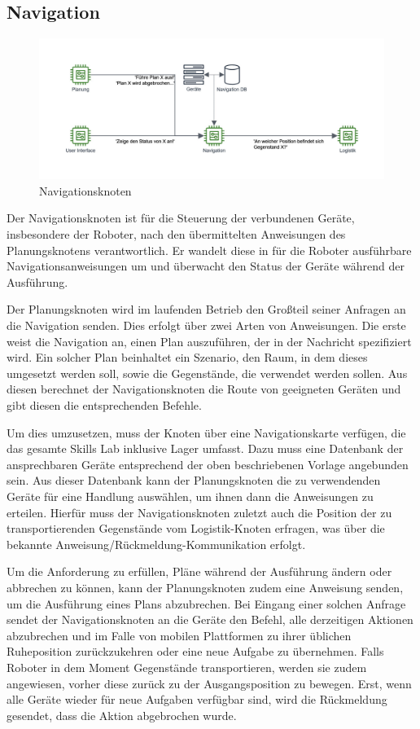\FloatBarrier
\newpage \subsection{Navigation}

\begin{figure}[h]
\centering
\includegraphics[width=\textwidth]{Bilder/3_Navigation.png}
\caption{Navigationsknoten}
\end{figure}

Der Navigationsknoten ist für die Steuerung der verbundenen Geräte, insbesondere der Roboter, nach den übermittelten Anweisungen des Planungsknotens verantwortlich. Er wandelt diese in für die Roboter ausführbare Navigationsanweisungen um und überwacht den Status der Geräte während der Ausführung.

Der Planungsknoten wird im laufenden Betrieb den Großteil seiner Anfragen an die Navigation senden. Dies erfolgt über zwei Arten von Anweisungen. Die erste weist die Navigation an, einen Plan auszuführen, der in der Nachricht spezifiziert wird. Ein solcher Plan beinhaltet ein Szenario, den Raum, in dem dieses umgesetzt werden soll, sowie die Gegenstände, die verwendet werden sollen. Aus diesen berechnet der Navigationsknoten die Route von geeigneten Geräten und gibt diesen die entsprechenden Befehle.

Um dies umzusetzen, muss der Knoten über eine Navigationskarte verfügen, die das gesamte Skills Lab inklusive Lager umfasst. Dazu muss eine Datenbank der ansprechbaren Geräte entsprechend der oben beschriebenen Vorlage angebunden sein. Aus dieser Datenbank kann der Planungsknoten die zu verwendenden Geräte für eine Handlung auswählen, um ihnen dann die Anweisungen zu erteilen. Hierfür muss der Navigationsknoten zuletzt auch die Position der zu transportierenden Gegenstände vom Logistik-Knoten erfragen, was über die bekannte Anweisung/Rückmeldung-Kommunikation erfolgt.

Um die Anforderung zu erfüllen, Pläne während der Ausführung ändern oder abbrechen zu können, kann der Planungsknoten zudem eine Anweisung senden, um die Ausführung eines Plans abzubrechen. Bei Eingang einer solchen Anfrage sendet der Navigationsknoten an die Geräte den Befehl, alle derzeitigen Aktionen abzubrechen und im Falle von mobilen Plattformen zu ihrer üblichen Ruheposition zurückzukehren oder eine neue Aufgabe zu übernehmen. Falls Roboter in dem Moment Gegenstände transportieren, werden sie zudem angewiesen, vorher diese zurück zu der Ausgangsposition zu bewegen. Erst, wenn alle Geräte wieder für neue Aufgaben verfügbar sind, wird die Rückmeldung gesendet, dass die Aktion abgebrochen wurde.

